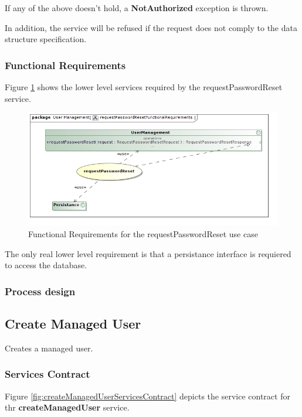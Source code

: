 If any of the above doesn't hold, a \textbf{NotAuthorized} exception is thrown.

In addition, the service will be refused if the request does not comply to the data structure specification.

\subsubsection{Functional Requirements}
Figure \ref{fig:requestPasswordResetFR} shows the lower level services required by the requestPasswordReset service.

\begin{figure}[H]
	\begin{center}
		\includegraphics[scale=0.55]{../Diagrams and Charts/Users/requestPasswordResetFunctionalRequirements.jpg}
		\caption{Functional Requirements for the requestPasswordReset use case}
		\label{fig:requestPasswordResetFR}
	\end{center}
\end{figure}

The only real lower level requirement is that a persistance interface is requiered
to access the database.

\subsubsection{Process design}

\subsection{Create Managed User}
Creates a managed user.

\subsubsection{Services Contract}
Figure \ref{fig:createManagedUserServicesContract} depicts the service contract for thr \textbf{createManagedUser} service.

